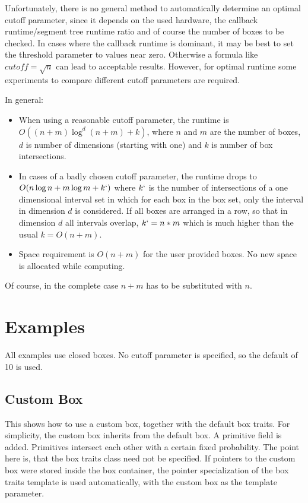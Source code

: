 Unfortunately, there is no general method to automatically determine an optimal cutoff parameter, since it depends on the used hardware, the callback runtime/segment tree runtime ratio and of course the number of boxes to be checked. In cases where the callback runtime is dominant, it may be best to set the threshold parameter to values near zero. Otherwise a formula like $cutoff=\sqrt{n}$ can lead to acceptable results. However, for optimal runtime some experiments to compare different cutoff parameters are required.

In general:
\begin{itemize}
  \item When using a reasonable cutoff parameter, the runtime is $O((n+m)\log^{d}(n+m)+k)$, where $n$ and $m$ are the number of boxes, $d$ is number of dimensions (starting with one) and $k$ is number of box intersections.
  \item In cases of a badly chosen cutoff parameter, the runtime drops to $O(n\log n+m\log m+k`)$ where $k`$ is the number of intersections of a one dimensional interval set in which for each box in the box set, only the interval in dimension $d$ is considered. If all boxes are arranged in a row, so that in dimension $d$ all intervals overlap, $k`=n*m$ which is much higher than the usual $k=O(n+m)$.
  \item Space requirement is $O(n+m)$ for the user provided boxes. No new space is allocated while computing.
\end{itemize}

Of course, in the complete case $n+m$ has to be substituted with $n$.

\section{Examples}
All examples use closed boxes. No cutoff parameter is specified, so the default of 10 is used. 

\subsection{Custom Box}
This shows how to use a custom box, together with the default box traits. For simplicity, the custom box inherits from the default box. A primitive field is added. Primitives intersect each other with a certain fixed probability. The point here is, that the box traits class need not be specified. If pointers to the custom box were stored inside the box container, the pointer specialization of the box traits template is used automatically, with the custom box as the template parameter.

